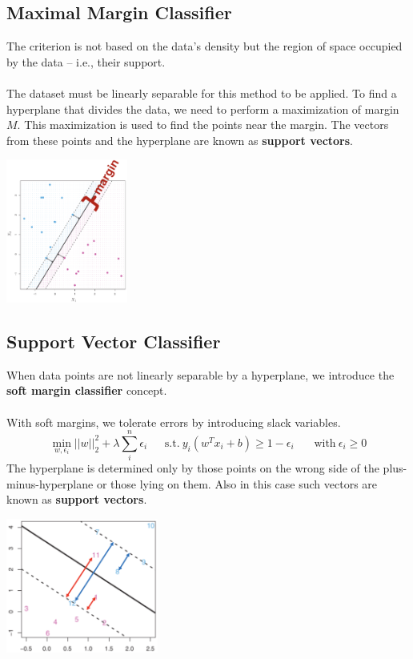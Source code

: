 \documentclass{article}
\begin{document}
\subsection{Maximal Margin Classifier}
The criterion is not based on the data's density but the region of space occupied by the data -- i.e., their support. \\ \\
The dataset must be linearly separable for this method to be applied. To find a hyperplane that divides the data, we need to perform a maximization of margin $M$. This maximization is used to find the points near the margin. The vectors from these points and the hyperplane are known as \textbf{support vectors}.

\begin{center}
	\includegraphics[width=4cm]{assets/mmc.png}
\end{center}

\subsection{Support Vector Classifier}
When data points are not linearly separable by a hyperplane, we introduce the \textbf{soft margin classifier} concept. \\ \\
With soft margins, we tolerate errors by introducing slack variables.
\[ \min_{w, \epsilon_i}||w||^2_2 + \lambda \displaystyle\sum^n_i \epsilon_i ~~~~~~~ \text{s.t.} ~ y_i(w^Tx_i + b) \geq 1 - \epsilon_i ~~~~~~~~ \text{with}~\epsilon_i \geq 0 \]
The hyperplane is determined only by those points on the wrong side of the plus-minus-hyperplane or those lying on them. Also in this case such vectors are known as \textbf{support vectors}.

\begin{center}
	\includegraphics[width=5cm]{assets/svc.png}
\end{center}
\end{document}
